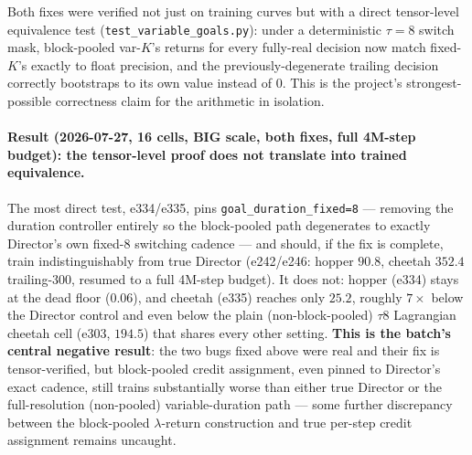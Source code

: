 \documentclass[10pt]{article}
\begin{document}
Both fixes were verified not just on training curves but with a direct
tensor-level equivalence test (\texttt{test\_variable\_goals.py}): under a
deterministic $\tau{=}8$ switch mask, block-pooled var-$K$'s returns for
every fully-real decision now match fixed-$K$'s exactly to float precision,
and the previously-degenerate trailing decision correctly bootstraps to its
own value instead of $0$. This is the project's strongest-possible
correctness claim for the arithmetic in isolation.

\paragraph{Result (2026-07-27, 16 cells, BIG scale, both fixes, full 4M-step
budget): the tensor-level proof does not translate into trained
equivalence.} The most direct test, e334/e335, pins
\texttt{goal\_duration\_fixed=8} --- removing the duration controller
entirely so the block-pooled path degenerates to exactly Director's own
fixed-8 switching cadence --- and should, if the fix is complete, train
indistinguishably from true Director (e242/e246: hopper $90.8$, cheetah
$352.4$ trailing-300, resumed to a full 4M-step budget). It does not:
hopper (e334) stays at the dead floor ($0.06$), and cheetah (e335) reaches
only $25.2$, roughly $7\times$ below the Director control and even below
the plain (non-block-pooled) $\tau8$ Lagrangian cheetah cell (e303, $194.5$)
that shares every other setting. \textbf{This is the batch's central
negative result}: the two bugs fixed above were real and their fix is
tensor-verified, but block-pooled credit assignment, even pinned to
Director's exact cadence, still trains substantially worse than either true
Director or the full-resolution (non-pooled) variable-duration path ---
some further discrepancy between the block-pooled $\lambda$-return
construction and true per-step credit assignment remains uncaught.
\end{document}
